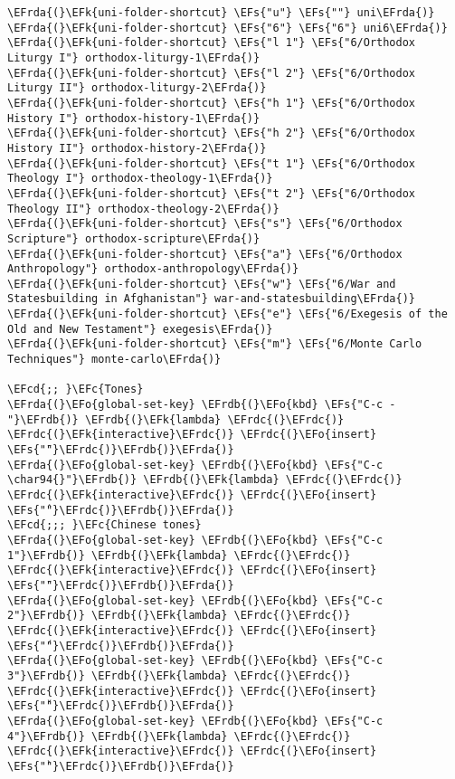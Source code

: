 \documentclass[a4wide,10pt]{article}
\newcommand{\EFc}[1]{\textcolor{EFc}{#1}} %
\newcommand{\EFcd}[1]{\textcolor{EFcd}{#1}} %
\newcommand{\EFs}[1]{\textcolor{EFs}{#1}} %
\newcommand{\EFk}[1]{\textcolor{EFk}{#1}} %
\newcommand{\EFo}[1]{\textcolor{EFo}{#1}} %
\newcommand{\EFrda}[1]{\textcolor{EFrda}{#1}} %
\newcommand{\EFrdb}[1]{\textcolor{EFrdb}{#1}} %
\newcommand{\EFrdc}[1]{\textcolor{EFrdc}{#1}} %
\begin{document}
\begin{Code}
\begin{Verbatim}
\EFrda{(}\EFk{uni-folder-shortcut} \EFs{"u"} \EFs{""} uni\EFrda{)}
\EFrda{(}\EFk{uni-folder-shortcut} \EFs{"6"} \EFs{"6"} uni6\EFrda{)}
\EFrda{(}\EFk{uni-folder-shortcut} \EFs{"l 1"} \EFs{"6/Orthodox Liturgy I"} orthodox-liturgy-1\EFrda{)}
\EFrda{(}\EFk{uni-folder-shortcut} \EFs{"l 2"} \EFs{"6/Orthodox Liturgy II"} orthodox-liturgy-2\EFrda{)}
\EFrda{(}\EFk{uni-folder-shortcut} \EFs{"h 1"} \EFs{"6/Orthodox History I"} orthodox-history-1\EFrda{)}
\EFrda{(}\EFk{uni-folder-shortcut} \EFs{"h 2"} \EFs{"6/Orthodox History II"} orthodox-history-2\EFrda{)}
\EFrda{(}\EFk{uni-folder-shortcut} \EFs{"t 1"} \EFs{"6/Orthodox Theology I"} orthodox-theology-1\EFrda{)}
\EFrda{(}\EFk{uni-folder-shortcut} \EFs{"t 2"} \EFs{"6/Orthodox Theology II"} orthodox-theology-2\EFrda{)}
\EFrda{(}\EFk{uni-folder-shortcut} \EFs{"s"} \EFs{"6/Orthodox Scripture"} orthodox-scripture\EFrda{)}
\EFrda{(}\EFk{uni-folder-shortcut} \EFs{"a"} \EFs{"6/Orthodox Anthropology"} orthodox-anthropology\EFrda{)}
\EFrda{(}\EFk{uni-folder-shortcut} \EFs{"w"} \EFs{"6/War and Statesbuilding in Afghanistan"} war-and-statesbuilding\EFrda{)}
\EFrda{(}\EFk{uni-folder-shortcut} \EFs{"e"} \EFs{"6/Exegesis of the Old and New Testament"} exegesis\EFrda{)}
\EFrda{(}\EFk{uni-folder-shortcut} \EFs{"m"} \EFs{"6/Monte Carlo Techniques"} monte-carlo\EFrda{)}

\EFcd{;; }\EFc{Tones}
\EFrda{(}\EFo{global-set-key} \EFrdb{(}\EFo{kbd} \EFs{"C-c -"}\EFrdb{)} \EFrdb{(}\EFk{lambda} \EFrdc{(}\EFrdc{)} \EFrdc{(}\EFk{interactive}\EFrdc{)} \EFrdc{(}\EFo{insert} \EFs{"̄"}\EFrdc{)}\EFrdb{)}\EFrda{)}
\EFrda{(}\EFo{global-set-key} \EFrdb{(}\EFo{kbd} \EFs{"C-c \char94{}"}\EFrdb{)} \EFrdb{(}\EFk{lambda} \EFrdc{(}\EFrdc{)} \EFrdc{(}\EFk{interactive}\EFrdc{)} \EFrdc{(}\EFo{insert} \EFs{"̂"}\EFrdc{)}\EFrdb{)}\EFrda{)}
\EFcd{;;; }\EFc{Chinese tones}
\EFrda{(}\EFo{global-set-key} \EFrdb{(}\EFo{kbd} \EFs{"C-c 1"}\EFrdb{)} \EFrdb{(}\EFk{lambda} \EFrdc{(}\EFrdc{)} \EFrdc{(}\EFk{interactive}\EFrdc{)} \EFrdc{(}\EFo{insert} \EFs{"̄"}\EFrdc{)}\EFrdb{)}\EFrda{)}
\EFrda{(}\EFo{global-set-key} \EFrdb{(}\EFo{kbd} \EFs{"C-c 2"}\EFrdb{)} \EFrdb{(}\EFk{lambda} \EFrdc{(}\EFrdc{)} \EFrdc{(}\EFk{interactive}\EFrdc{)} \EFrdc{(}\EFo{insert} \EFs{"́"}\EFrdc{)}\EFrdb{)}\EFrda{)}
\EFrda{(}\EFo{global-set-key} \EFrdb{(}\EFo{kbd} \EFs{"C-c 3"}\EFrdb{)} \EFrdb{(}\EFk{lambda} \EFrdc{(}\EFrdc{)} \EFrdc{(}\EFk{interactive}\EFrdc{)} \EFrdc{(}\EFo{insert} \EFs{"̌"}\EFrdc{)}\EFrdb{)}\EFrda{)}
\EFrda{(}\EFo{global-set-key} \EFrdb{(}\EFo{kbd} \EFs{"C-c 4"}\EFrdb{)} \EFrdb{(}\EFk{lambda} \EFrdc{(}\EFrdc{)} \EFrdc{(}\EFk{interactive}\EFrdc{)} \EFrdc{(}\EFo{insert} \EFs{"̀"}\EFrdc{)}\EFrdb{)}\EFrda{)}


\end{Verbatim}
\end{Code}
\end{document}
